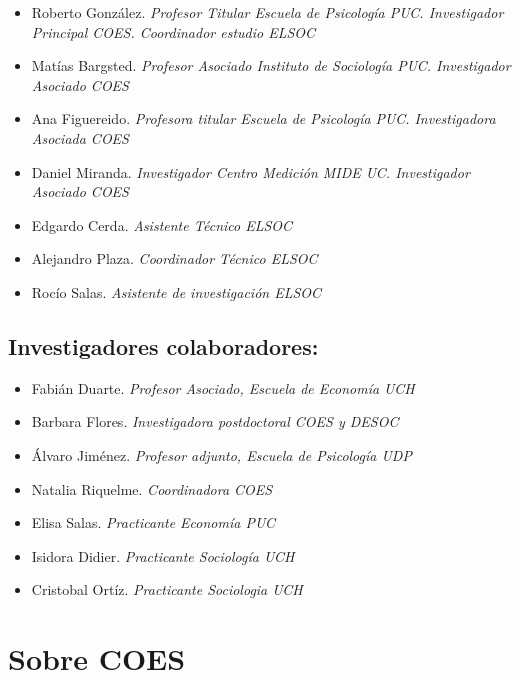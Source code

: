 \documentclass[
  12pt,
]{book}
\providecommand{\tightlist}{%
  \setlength{\itemsep}{0pt}\setlength{\parskip}{0pt}}
\begin{document}
\begin{itemize}
\tightlist
\item
  Roberto González. \emph{Profesor Titular Escuela de Psicología PUC. Investigador Principal COES. Coordinador estudio ELSOC}
\item
  Matías Bargsted. \emph{Profesor Asociado Instituto de Sociología PUC. Investigador Asociado COES}
\item
  Ana Figuereido. \emph{Profesora titular Escuela de Psicología PUC. Investigadora Asociada COES}
\item
  Daniel Miranda. \emph{Investigador Centro Medición MIDE UC. Investigador Asociado COES}
\item
  Edgardo Cerda. \emph{Asistente Técnico ELSOC}
\item
  Alejandro Plaza. \emph{Coordinador Técnico ELSOC}
\item
  Rocío Salas. \emph{Asistente de investigación ELSOC}
\end{itemize}

\hypertarget{investigadores-colaboradores}{%
\subsection*{Investigadores colaboradores:}\label{investigadores-colaboradores}}

\begin{itemize}
\tightlist
\item
  Fabián Duarte. \emph{Profesor Asociado, Escuela de Economía UCH}
\item
  Barbara Flores. \emph{Investigadora postdoctoral COES y DESOC}
\item
  Álvaro Jiménez. \emph{Profesor adjunto, Escuela de Psicología UDP}
\item
  Natalia Riquelme. \emph{Coordinadora COES}
\item
  Elisa Salas. \emph{Practicante Economía PUC}
\item
  Isidora Didier. \emph{Practicante Sociología UCH}
\item
  Cristobal Ortíz. \emph{Practicante Sociologia UCH}
\end{itemize}

\hypertarget{sobre-coes}{%
\section*{Sobre COES}\label{sobre-coes}}
\end{document}
